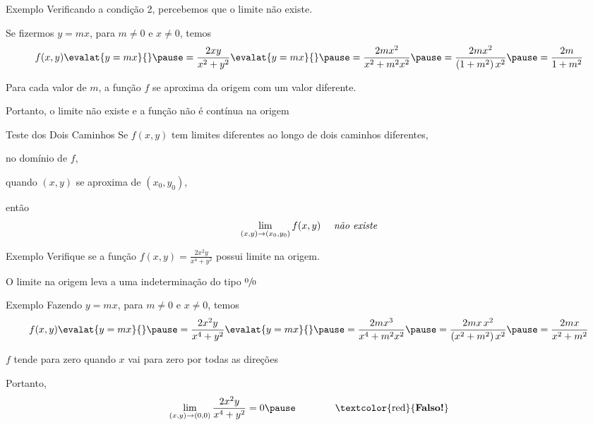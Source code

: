 \begin{frame}{Exemplo \theexemplo}
  Verificando a condição 2, percebemos que o limite não existe.

  \pause
  Se fizermos \(y=mx\),
  \pause
  para \(m\neq 0\) e \(x\neq 0\), temos
  \pause
  \[
    f(x, y)\evalat{y=mx}{}
    \pause
    = \frac{2xy}{x^2+y^2}\evalat{y=mx}{}
    \pause
    = \frac{2mx^2}{x^2+m^2x^2}
    \pause
    = \frac{2mx^2}{\left(1+m^2\right)x^2}
    \pause
    = \frac{2m}{1+m^2}
  \]

  \pause
  Para cada valor de $m$, a função $f$ se aproxima da origem com um valor diferente.

  \pause
  Portanto, o limite não existe e a função não é contínua na origem
\end{frame}

\begin{frame}{Teste dos Dois Caminhos}
  Se \(f(x, y)\) tem limites diferentes ao longo de dois caminhos
  diferentes,

  \pause
  no domínio de $f$,

  \pause
  quando $(x, y)$ se aproxima de $(x_0, y_0)$,

  \pause
  então
  \[
    \lim_{(x, y)\to(x_0, y_0)} f(x, y) \quad \text{ \emph{não existe}}
  \]
\end{frame}

\addtocounter{exemplo}{1}
\begin{frame}{Exemplo \theexemplo}
  Verifique se a função
  \(
    f(x, y) = \frac{2x^2y}{x^4+y^2}
  \)
  possui limite na origem.

  \pause
  \vspace{\baselineskip}
  O limite na origem leva a uma indeterminação do tipo $\sfrac{0}{0}$
\end{frame}

\begin{frame}{Exemplo \theexemplo}
  Fazendo \(y=mx\), para \(m\neq 0\) e \(x\neq 0\),
  \pause
  temos
  \[
    f(x, y)\evalat{y=mx}{}
    \pause
    = \frac{2x^2y}{x^4+y^2} \evalat{y=mx}{}
    \pause
    = \frac{2mx^3}{x^4+m^2x^2}
    \pause
    = \frac{2mx\,x^2}{\left(x^2+m^2\right)x^2}
    \pause
    = \frac{2mx}{x^2+m^2}
  \]

  \pause
  $f$ tende para zero quando $x$ vai para zero por todas as direções

  \pause
  Portanto,
  \[
    \lim_{(x, y)\to(0, 0)} \frac{2x^2y}{x^4+y^2} = 0
    \pause
    \qquad
    \qquad
    \text{\textcolor{red}{\textbf{Falso!}}}
  \]
\end{frame}

